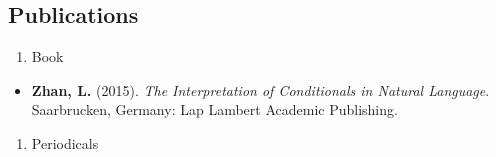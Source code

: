 \documentclass[
  12pt,
]{article}
\providecommand{\tightlist}{%
  \setlength{\itemsep}{0pt}\setlength{\parskip}{0pt}}
\begin{document}
\hypertarget{publications}{%
\subsection{Publications}\label{publications}}

\begin{enumerate}
\def\labelenumi{\arabic{enumi}.}
\tightlist
\item
  Book
\end{enumerate}

\begin{itemize}
\tightlist
\item
  \textbf{Zhan, L.} (2015). \emph{The Interpretation of Conditionals in
  Natural Language}. Saarbrucken, Germany: Lap Lambert Academic
  Publishing.
\end{itemize}

\begin{enumerate}
\def\labelenumi{\arabic{enumi}.}
\setcounter{enumi}{1}
\tightlist
\item
  Periodicals
\end{enumerate}
\end{document}
